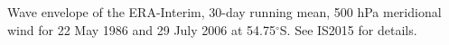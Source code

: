 \label{fig:example_figure}
Wave envelope of the ERA-Interim, 30-day running mean, 500 hPa meridional wind for 22 May 1986 and 29 July 2006 at 54.75$^{\circ}$S. See IS2015 for details. 
  
  
  